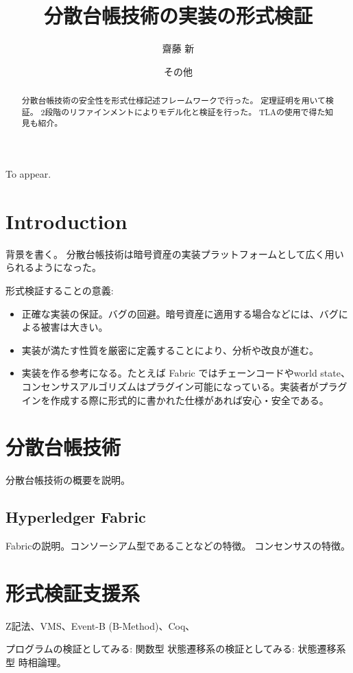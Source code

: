 \documentclass{fose2019}           %
\title{分散台帳技術の実装の形式検証}
\author{齋藤 新}{Shin Saito, IBM Research-Tokyo}
\author{その他}{Others, other}
\begin{document}
\maketitle


\begin{abstract}
分散台帳技術の安全性を形式仕様記述フレームワークで行った。
定理証明を用いて検証。
2段階のリファインメントによりモデル化と検証を行った。
TLAの使用で得た知見も紹介。
\end{abstract}
\begin{eabstract}
To appear.
\end{eabstract}

\section{Introduction}
背景を書く。
分散台帳技術は暗号資産の実装プラットフォームとして広く用いられるようになった。

形式検証することの意義:

\begin{itemize}
\item 正確な実装の保証。バグの回避。暗号資産に適用する場合などには、バグによる被害は大きい。
\item 実装が満たす性質を厳密に定義することにより、分析や改良が進む。
\item 実装を作る参考になる。たとえば Fabric ではチェーンコードやworld state、コンセンサスアルゴリズムはプラグイン可能になっている。実装者がプラグインを作成する際に形式的に書かれた仕様があれば安心・安全である。
\end{itemize}

\section{分散台帳技術}
分散台帳技術の概要を説明。

\subsection{Hyperledger Fabric}

Fabricの説明。コンソーシアム型であることなどの特徴。
コンセンサスの特徴。

\section{形式検証支援系}
Z記法、VMS、Event-B (B-Method)、Coq、

プログラムの検証としてみる: 関数型
状態遷移系の検証としてみる: 状態遷移系型
時相論理。
\end{document}
